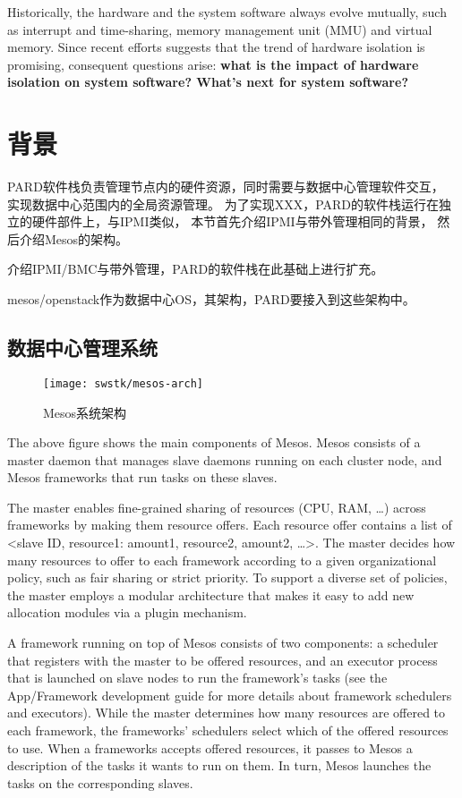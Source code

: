 Historically, the hardware and the system software always evolve mutually, such as
interrupt and time-sharing, memory management unit (MMU) and virtual memory.
Since recent efforts suggests that the trend of hardware isolation is promising,
consequent questions arise: \textbf{what is the impact of hardware isolation on system
software? What's next for system software?}


\section{背景}

PARD软件栈负责管理节点内的硬件资源，同时需要与数据中心管理软件交互，
实现数据中心范围内的全局资源管理。
为了实现XXX，PARD的软件栈运行在独立的硬件部件上，与IPMI类似，
本节首先介绍IPMI\cite{ipmi}与带外管理相同的背景，
然后介绍Mesos\cite{Hindman:2011:Mesos}的架构。

介绍IPMI/BMC与带外管理，PARD的软件栈在此基础上进行扩充。

mesos/openstack作为数据中心OS，其架构，PARD要接入到这些架构中。

\subsection{数据中心管理系统}

\begin{figure}[tbh]
  \centering
  \texttt{[image: swstk/mesos-arch]}
  \caption{Mesos系统架构}
  \label{fig:mesos-arch}
\end{figure}

The above figure shows the main components of Mesos. Mesos consists of a master daemon that manages slave daemons running on each cluster node, and Mesos frameworks that run tasks on these slaves.

The master enables fine-grained sharing of resources (CPU, RAM, …) across frameworks by making them resource offers. Each resource offer contains a list of <slave ID, resource1: amount1, resource2, amount2, …>. The master decides how many resources to offer to each framework according to a given organizational policy, such as fair sharing or strict priority. To support a diverse set of policies, the master employs a modular architecture that makes it easy to add new allocation modules via a plugin mechanism.

A framework running on top of Mesos consists of two components: a scheduler that registers with the master to be offered resources, and an executor process that is launched on slave nodes to run the framework’s tasks (see the App/Framework development guide for more details about framework schedulers and executors). While the master determines how many resources are offered to each framework, the frameworks' schedulers select which of the offered resources to use. When a frameworks accepts offered resources, it passes to Mesos a description of the tasks it wants to run on them. In turn, Mesos launches the tasks on the corresponding slaves.

